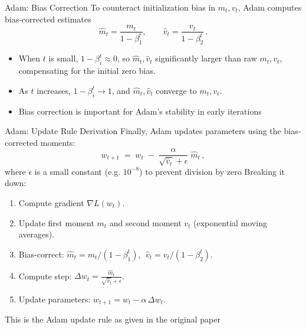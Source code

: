 \documentclass{beamer}
\begin{document}
\begin{frame}{Adam: Bias Correction}
  To counteract initialization bias in $m_t, v_t$, Adam computes bias-corrected estimates
  \[
    \hat{m}_t = \frac{m_t}{1 - \beta_1^t}, 
    \qquad 
    \hat{v}_t = \frac{v_t}{1 - \beta_2^t}\,. 
  \]
  \begin{itemize}
    \item When $t$ is small, $1-\beta_i^t \approx 0$, so $\hat{m}_t, \hat{v}_t$ significantly larger than raw $m_t, v_t$, compensating for the initial zero bias.
    \item As $t$ increases, $1-\beta_i^t \to 1$, and $\hat{m}_t, \hat{v}_t$ converge to $m_t, v_t$.
    \item Bias correction is important for Adam’s stability in early iterations
  \end{itemize}
\end{frame}

\begin{frame}{Adam: Update Rule Derivation}
  Finally, Adam updates parameters using the bias-corrected moments:
  \[
    w_{t+1} \;=\; w_t \;-\; \frac{\alpha}{\sqrt{\hat{v}_t} + \epsilon}\; \hat{m}_t \,,
  \] 
  where $\epsilon$ is a small constant (e.g. $10^{-8}$) to prevent division by zero
  \vspace{0.3cm}
  Breaking it down:
  \begin{enumerate}
    \item Compute gradient $\nabla L(w_t)$.
    \item Update first moment $m_t$ and second moment $v_t$ (exponential moving averages).
    \item Bias-correct: $\hat{m}_t = m_t/(1-\beta_1^t)$, $\; \hat{v}_t = v_t/(1-\beta_2^t)$.
    \item Compute step: $\Delta w_t = \frac{\hat{m}_t}{\sqrt{\hat{v}_t} + \epsilon}$.
    \item Update parameters: $w_{t+1} = w_t - \alpha\, \Delta w_t$.
  \end{enumerate}
  This is the Adam update rule as given in the original paper
\end{frame}
\end{document}
